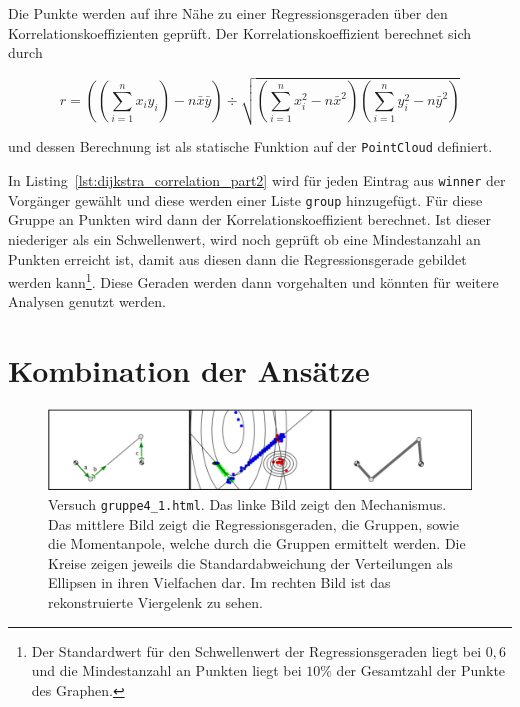 Die Punkte werden auf ihre Nähe zu einer Regressionsgeraden über den Korrelationskoeffizienten geprüft.
Der Korrelationskoeffizient berechnet sich durch~\cite{Papula2014}

\begin{equation}
    r = \left(\left(\sum_{i=1}^n x_i y_i\right) - n \bar{x} \bar{y}\right) \div \sqrt{\left(\sum_{i=1}^n x_i^2 - n\bar{x}^2\right)\left(\sum_{i=1}^n y_i^2 - n \bar{y}^2\right)}
    \label{eq:korrelationskoeffizient}
\end{equation}

und dessen Berechnung ist als statische Funktion auf der \lstinline{PointCloud} definiert.

In Listing~\ref{lst:dijkstra_correlation_part2} wird für jeden Eintrag aus \lstinline{winner} der Vorgänger gewählt und diese werden einer Liste \lstinline{group} hinzugefügt.
Für diese Gruppe an Punkten wird dann der Korrelationskoeffizient berechnet.
Ist dieser niederiger als ein Schwellenwert, wird noch geprüft ob eine Mindestanzahl an Punkten erreicht ist, damit aus diesen dann die Regressionsgerade gebildet werden kann\footnote{Der Standardwert für den Schwellenwert der Regressionsgeraden liegt bei $0,6$ und die Mindestanzahl an Punkten liegt bei $10\%$ der Gesamtzahl der Punkte des Graphen.}.
Diese Geraden werden dann vorgehalten und könnten für weitere Analysen genutzt werden.

\section{Kombination der Ansätze}

\begin{figure}
    \centering
    \includegraphics[width=\textwidth]{gfx/gruppe4_1.png}
    \caption[Versuch \lstinline{gruppe4_1.html}]{Versuch \lstinline{gruppe4_1.html}. Das linke Bild zeigt den Mechanismus. Das mittlere Bild zeigt die Regressionsgeraden, die Gruppen, sowie die Momentanpole, welche durch die Gruppen ermittelt werden. Die Kreise zeigen jeweils die Standardabweichung der Verteilungen als Ellipsen in ihren Vielfachen dar. Im rechten Bild ist das rekonstruierte Viergelenk zu sehen.}
    \label{fig:gruppe4_1}
\end{figure}

